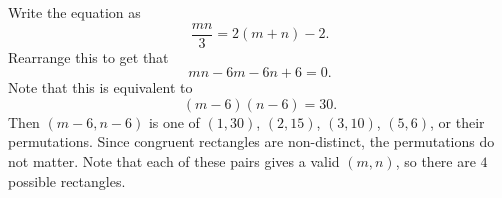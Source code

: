 Write the equation as \[\frac{mn}{3}=2\left(m+n\right)-2.\] Rearrange this to get that \[mn-6m-6n+6=0.\] Note that this is equivalent to \[\left(m-6\right)\left(n-6\right)=30.\] Then $\left(m-6,n-6\right)$ is one of $\left(1,30\right)$, $\left(2,15\right)$, $\left(3,10\right)$, $\left(5,6\right)$, or their permutations. Since congruent rectangles are non-distinct, the permutations do not matter. Note that each of these pairs gives a valid $\left(m,n\right)$, so there are $\boxed{4}$ possible rectangles.